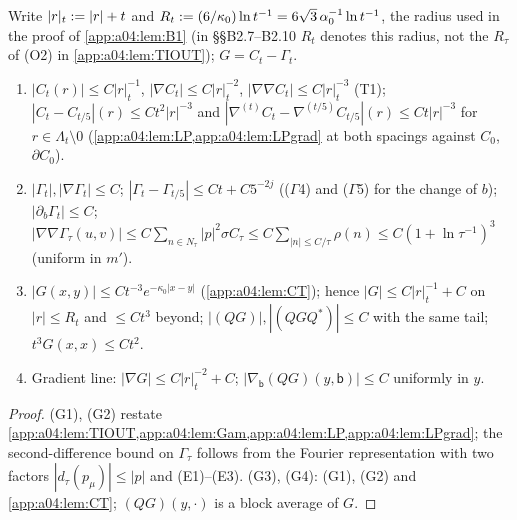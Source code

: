 \begin{lemma}\label{app:a04:lem:G}
Write $|r|_t:=|r|+t$ and $R_t:=(6/\kappa_0)\ln t^{-1}=6\sqrt3\,\alpha_0^{-1}\ln t^{-1}$, the radius used in the proof of \cref{app:a04:lem:B1} (in \S\S B2.7--B2.10 $R_t$ denotes this radius, not the $R_\tau$ of (O2) in \cref{app:a04:lem:TIOUT}); $G=C_t-\Gamma_t$.
\begin{enumerate}[label=\textup{(G\arabic*)},leftmargin=*]
\item $|C_t(r)|\le C|r|_t^{-1}$, $|\nabla C_t|\le C|r|_t^{-2}$, $|\nabla\nabla C_t|\le C|r|_t^{-3}$ (T1); $|C_t-C_{t/5}|(r)\le Ct^2|r|^{-3}$ and $|\nabla^{(t)}C_t-\nabla^{(t/5)}C_{t/5}|(r)\le Ct|r|^{-3}$ for $r\in\Lambda_t\setminus0$ (\cref{app:a04:lem:LP,app:a04:lem:LPgrad} at both spacings against $C_0$, $\partial C_0$).
\item $|\Gamma_t|,|\nabla\Gamma_t|\le C$; $|\Gamma_t-\Gamma_{t/5}|\le Ct+C5^{-2j}$ (($\Gamma$4) and ($\Gamma$5) for the change of $b$); $|\partial_b\Gamma_t|\le C$; $|\nabla\nabla\Gamma_\tau(u,v)|\le C\sum_{n\in N_\tau}|p|^2\sigma\hat C_\tau\le C\sum_{|n|\le C/\tau}\rho(n)\le C(1+\ln\tau^{-1})^3$ (uniform in $m'$).
\item $|G(x,y)|\le Ct^{-3}e^{-\kappa_0|x-y|}$ (\cref{app:a04:lem:CT}); hence $|G|\le C|r|_t^{-1}+C$ on $|r|\le R_t$ and $\le Ct^3$ beyond; $|(QG)|,|(QGQ^*)|\le C$ with the same tail; $t^3G(x,x)\le Ct^2$.
\item Gradient line: $|\nabla G|\le C|r|_t^{-2}+C$; $|\nabla_{\mathsf b}(QG)(y,\mathsf b)|\le C$ uniformly in $y$.
\end{enumerate}
\end{lemma}
\begin{proof}
(G1), (G2) restate \cref{app:a04:lem:TIOUT,app:a04:lem:Gam,app:a04:lem:LP,app:a04:lem:LPgrad}; the second-difference bound on $\Gamma_\tau$ follows from the Fourier representation with two factors $|d_\tau(p_\mu)|\le|p|$ and (E1)--(E3). (G3), (G4): (G1), (G2) and \cref{app:a04:lem:CT}; $(QG)(y,\cdot)$ is a block average of $G$.
\end{proof}

